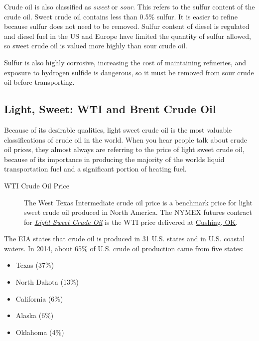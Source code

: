 \documentclass[
]{book}
\providecommand{\tightlist}{%
  \setlength{\itemsep}{0pt}\setlength{\parskip}{0pt}}
\begin{document}
Crude oil is also classified as \emph{sweet} or \emph{sour}. This refers to the sulfur content of the crude oil. Sweet crude oil contains less than 0.5\% sulfur. It is easier to refine because sulfur does not need to be removed. Sulfur content of diesel is regulated and diesel fuel in the US and Europe have limited the quantity of sulfur allowed, so sweet crude oil is valued more highly than sour crude oil.

Sulfur is also highly corrosive, increasing the cost of maintaining refineries, and exposure to hydrogen sulfide is dangerous, so it must be removed from sour crude oil before transporting.

\hypertarget{light-sweet-wti-and-brent-crude-oil}{%
\subsection{Light, Sweet: WTI and Brent Crude Oil}\label{light-sweet-wti-and-brent-crude-oil}}

Because of its desirable qualities, light sweet crude oil is the most valuable classifications of crude oil in the world. When you hear people talk about crude oil prices, they almost always are referring to the price of light sweet crude oil, because of its importance in producing the majority of the worlds liquid transportation fuel and a significant portion of heating fuel.

\begin{description}
\item[WTI Crude Oil Price]
The West Texas Intermediate crude oil price is a benchmark price for light sweet crude oil produced in North America. The NYMEX futures contract for \href{http://www.cmegroup.com/trading/energy/crude-oil/light-sweet-crude.html}{\emph{Light Sweet Crude Oil}} is the WTI price delivered at \href{https://www.google.com/maps/place/Cushing,+OK+74023/@43.8498418,-87.2836175,5.17z/data=!4m2!3m1!1s0x87b169f80014c5c1:0xfe855f1914b195a}{Cushing, OK}.
\end{description}

The EIA states that crude oil is produced in 31 U.S. states and in U.S. coastal waters. In 2014, about 65\% of U.S. crude oil production came from five states:

\begin{itemize}
\tightlist
\item
  Texas (37\%)
\item
  North Dakota (13\%)
\item
  California (6\%)
\item
  Alaska (6\%)
\item
  Oklahoma (4\%)
\end{itemize}
\end{document}
